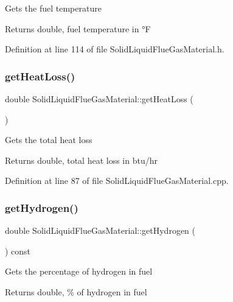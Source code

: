 Gets the fuel temperature \begin{DoxyReturn}{Returns}
double, fuel temperature in °F 
\end{DoxyReturn}


Definition at line 114 of file Solid\+Liquid\+Flue\+Gas\+Material.\+h.

\mbox{\label{class_solid_liquid_flue_gas_material_af7d36673e49f9b5eb631fc04227883d6}} 
\subsubsection{\texorpdfstring{get\+Heat\+Loss()}{getHeatLoss()}}
{\footnotesize\ttfamily double Solid\+Liquid\+Flue\+Gas\+Material\+::get\+Heat\+Loss (\begin{DoxyParamCaption}{ }\end{DoxyParamCaption})}

Gets the total heat loss \begin{DoxyReturn}{Returns}
double, total heat loss in btu/hr 
\end{DoxyReturn}


Definition at line 87 of file Solid\+Liquid\+Flue\+Gas\+Material.\+cpp.

\mbox{\label{class_solid_liquid_flue_gas_material_a26af2edd53c50b071648d03bc6442fb6}} 
\subsubsection{\texorpdfstring{get\+Hydrogen()}{getHydrogen()}}
{\footnotesize\ttfamily double Solid\+Liquid\+Flue\+Gas\+Material\+::get\+Hydrogen (\begin{DoxyParamCaption}{ }\end{DoxyParamCaption}) const\hspace{0.3cm}{\ttfamily [inline]}}

Gets the percentage of hydrogen in fuel \begin{DoxyReturn}{Returns}
double, \% of hydrogen in fuel 
\end{DoxyReturn}


